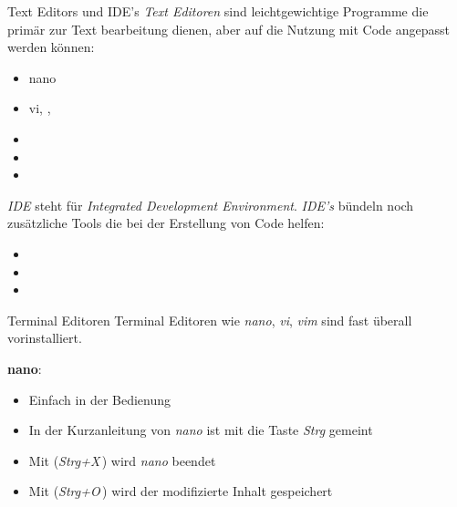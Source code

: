 \documentclass{setbeamer}
\begin{document}
\begin{frame}{Text Editors und IDE's}
    \emph{Text Editoren} sind leichtgewichtige Programme die primär zur Text bearbeitung dienen, aber auf die Nutzung mit Code angepasst werden können:
    \begin{itemize}
        \item nano
        \item vi, , 
        \item {}
        \item {}
        \item {}
    \end{itemize}

    \pause
    \vspace{0.3cm}

    \emph{IDE} steht für \emph{Integrated Development Environment}. \emph{IDE's} bündeln noch zusätzliche Tools die bei der Erstellung von Code helfen:
    \begin{itemize}
        \item {}
        \item {}
        \item {}
    \end{itemize}
\end{frame}

\begin{frame}{Terminal Editoren}
    Terminal Editoren wie \emph{nano}, \emph{vi}, \emph{vim} sind fast überall vorinstalliert.

    \pause
    \vspace{0.3cm}

    \textbf{nano}:
    \begin{itemize}
        \item Einfach in der Bedienung
        \item In der Kurzanleitung von \emph{nano} ist mit  die Taste \emph{Strg} gemeint
        \item Mit  (\emph{Strg+X}\,) wird \emph{nano} beendet
        \item Mit  (\emph{Strg+O}\,) wird der modifizierte Inhalt gespeichert 
    \end{itemize}
\end{frame}
\end{document}

